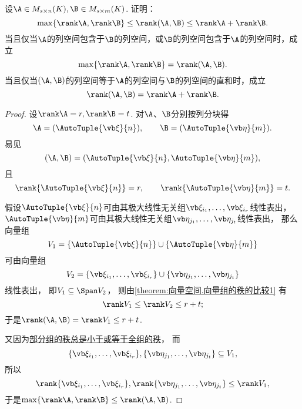 \begin{example}\label{example:矩阵乘积的秩.分块矩阵的秩的等式2}
设\(\A \in M_{s \times n}(K),
\B \in M_{s \times m}(K)\).
证明：\begin{equation}
	\max\{\rank\A,\rank\B\} \leq \rank(\A,\B) \leq \rank\A + \rank\B.
\end{equation}
当且仅当\(\A\)的列空间包含于\(\B\)的列空间，或\(\B\)的列空间包含于\(\A\)的列空间时，成立\begin{equation*}
	\max\{\rank\A,\rank\B\} = \rank(\A,\B).
\end{equation*}
当且仅当\((\A,\B)\)的列空间等于\(\A\)的列空间与\(\B\)的列空间的直和时，成立\begin{equation*}
	\rank(\A,\B) = \rank\A + \rank\B.
\end{equation*}
\begin{proof}
\def\as{\AutoTuple{\a}{n}}
\def\bs{\AutoTuple{\b}{m}}
\def\asi{\a_{i_1},\dotsc,\a_{i_r}}
\def\bsj{\b_{j_1},\dotsc,\b_{j_t}}
设\(\rank\A = r,
\rank\B = t\).
对\(\A\)、\(\B\)分别按列分块得\[
	\A = (\as),
	\qquad
	\B = (\bs).
\]
易见\[
	(\A,\B) = (\as,\bs),
\]且\[
	\rank\{\as\} = r,
	\qquad
	\rank\{\bs\} = t.
\]

假设\(\as\)可由其极大线性无关组\(\asi\)线性表出，
\(\bs\)可由其极大线性无关组\(\bsj\)线性表出，
那么向量组\[
	V_1=\{\as\}\cup\{\bs\}
\]可由向量组\[
	V_2=\{\asi\}\cup\{\bsj\}
\]线性表出，
即\(V_1 \subseteq \Span V_2\)，
则由\cref{theorem:向量空间.向量组的秩的比较1} 有\[
	\rank V_1
	\leq
	\rank V_2
	\leq
	r+t;
\]
于是\(\rank(\A,\B) = \rank V_1 \leq r+t\).

又因为\hyperref[theorem:向量空间.向量组的秩的比较2]{部分组的秩总是小于或等于全组的秩}，
而\[
	\{\asi\},\{\bsj\} \subseteq V_1,
\]
所以\[
	\rank\{\asi\},\rank\{\bsj\} \leq \rank V_1,
\]
于是\(\max\{\rank\A,\rank\B\} \leq \rank(\A,\B)\).
\end{proof}
\end{example}

